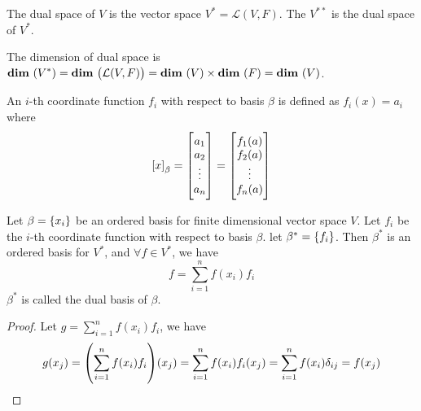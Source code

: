 \begin{definition}
	The dual space\label{dualspacedefinition} of $V$ is the vector space $V^* = \mathcal{L}(V,F)$. The  $V^{**}$ is the dual space of $V^*$.
\end{definition}


The dimension of dual space is $\dimension{V^*} = \dimension{\mathcal{L}(V,F)} = \dimension{V} \times \dimension{F} = \dimension{V}$.


\begin{definition}
	An $i$-th coordinate function $f_i$ with respect to basis $\beta$ is defined as $f_i(x) = a_i$ where
	\begin{equation*}
		\coordinate{x}_\beta = \begin{bmatrix}
			a_1 \\
			a_2 \\
			\vdots \\
			a_n
		\end{bmatrix} = \begin{bmatrix}
			f_1(a) \\
			f_2(a) \\
			\vdots \\
			f_n(a)
		\end{bmatrix}
	\end{equation*}
\end{definition}




\begin{definition}
	Let $\beta = \set{x_i}$ be an ordered basis for finite dimensional vector space $V$. Let $f_i$ be the $i$-th coordinate function with respect to basis $\beta$. let $\beta^*=\set{f_i}$. Then $\beta^*$ is an ordered basis for $V^*$, and $\forall f \in V^*$, we have
	\begin{equation}
		f = \sum_{i=1}^n f(x_i) f_i
	\end{equation}
	$\beta^*$ is called the dual basis of $\beta$.
\end{definition}
\begin{proof}
	Let $g =\displaystyle \sum_{i=1}^n f(x_i) f_i$, we have
	\begin{equation*}
	g(x_j) = \mleft( \sum_{i=1}^n f(x_i) f_i \mright) (x_j) = \sum_{i=1}^n f(x_i) f_i (x_j) = \sum_{i=1}^n f(x_i) \delta_{ij} =f(x_j)
	\end{equation*}
\end{proof}


